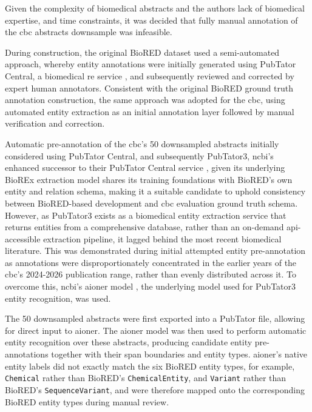 Given the complexity of biomedical abstracts and the authors lack of biomedical expertise, and time constraints, it was decided that fully manual annotation of the \gls{cbc} abstracts downsample was infeasible.

During construction, the original BioRED dataset used a semi-automated approach, whereby entity annotations were initially generated using PubTator Central, a biomedical \gls{re} service \cite{wei2019pubtator}, and subsequently reviewed and corrected by expert human annotators. Consistent with the original BioRED ground truth annotation construction, the same approach was adopted for the \gls{cbc}, using automated entity extraction as an initial annotation layer followed by manual verification and correction.

Automatic pre-annotation of the \gls{cbc}'s 50 downsampled abstracts initially considered using PubTator Central, and subsequently PubTator3, \gls{ncbi}'s enhanced successor to their PubTator Central service \cite{wei2024pubtator}, given its underlying BioREx extraction model shares its training foundations with BioRED's own entity and relation schema, making it a suitable candidate to uphold consistency between BioRED-based development and \gls{cbc} evaluation ground truth schema. However, as PubTator3 exists as a biomedical entity extraction service that returns entities from a comprehensive database, rather than an on-demand \gls{api}-accessible extraction pipeline, it lagged behind the most recent biomedical literature. This was demonstrated during initial attempted entity pre-annotation as annotations were disproportionately concentrated in the earlier years of the \gls{cbc}'s 2024-2026 publication range, rather than evenly distributed across it. To overcome this, \gls{ncbi}'s \gls{aioner} model \cite{luo2023aioner}, the underlying model used for PubTator3 entity recognition, was used.

The 50 downsampled abstracts were first exported into a PubTator file, allowing for direct input to \gls{aioner}. The \gls{aioner} model was then used to perform automatic entity recognition over these abstracts, producing candidate entity pre-annotations together with their span boundaries and entity types. \gls{aioner}'s native entity labels did not exactly match the six BioRED entity types, for example, \texttt{Chemical} rather than BioRED's \texttt{ChemicalEntity}, and \texttt{Variant} rather than BioRED's \texttt{SequenceVariant}, and were therefore mapped onto the corresponding BioRED entity types during manual review.

